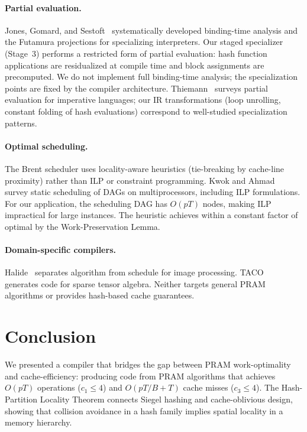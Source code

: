 \documentclass[11pt]{article}
\begin{document}
\paragraph{Partial evaluation.}
Jones, Gomard, and Sestoft~\cite{jones1993partial} systematically developed
binding-time analysis and the Futamura projections for specializing
interpreters.  Our staged specializer (Stage~3) performs a restricted
form of partial evaluation: hash function applications are residualized
at compile time and block assignments are precomputed.  We do not
implement full binding-time analysis; the specialization points are
fixed by the compiler architecture.  Thiemann~\cite{thiemann1999partial}
surveys partial evaluation for imperative languages; our IR
transformations (loop unrolling, constant folding of hash evaluations)
correspond to well-studied specialization patterns.

\paragraph{Optimal scheduling.}
The Brent scheduler uses locality-aware heuristics (tie-breaking by
cache-line proximity) rather than ILP or constraint programming.
Kwok and Ahmad~\cite{kwok1999static} survey static scheduling of DAGs
on multiprocessors, including ILP formulations.  For our application,
the scheduling DAG has $O(pT)$ nodes, making ILP impractical for large
instances.  The heuristic achieves within a constant factor of optimal
by the Work-Preservation Lemma.

\paragraph{Domain-specific compilers.}
Halide~\cite{ragan2013halide} separates algorithm from schedule for image
processing.  TACO~\cite{kjolstad2017tensor} generates code for sparse
tensor algebra.  Neither targets general PRAM algorithms or provides
hash-based cache guarantees.

\section{Conclusion}
\label{sec:conclusion}

We presented a compiler that bridges the gap between PRAM work-optimality
and cache-efficiency: producing code from PRAM algorithms that achieves
$O(pT)$ operations ($c_1 \le 4$) and $O(pT/B + T)$ cache misses
($c_3 \le 4$).  The Hash-Partition Locality Theorem connects Siegel hashing
and cache-oblivious design, showing that collision avoidance in a hash
family implies spatial locality in a memory hierarchy.
\end{document}
